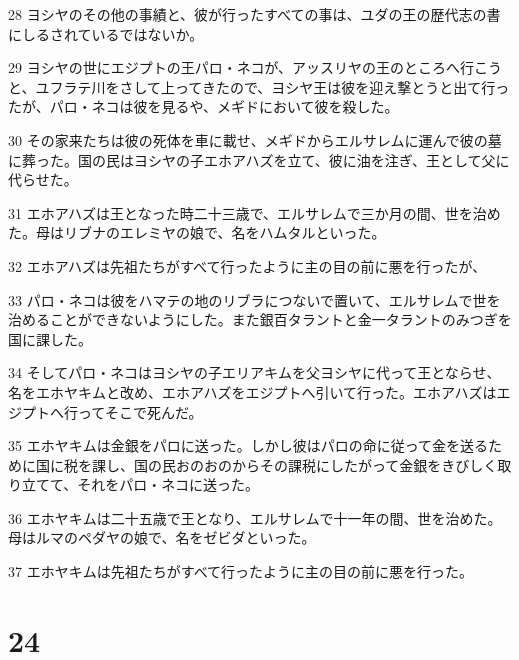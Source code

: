 \par 28 ヨシヤのその他の事績と、彼が行ったすべての事は、ユダの王の歴代志の書にしるされているではないか。
\par 29 ヨシヤの世にエジプトの王パロ・ネコが、アッスリヤの王のところへ行こうと、ユフラテ川をさして上ってきたので、ヨシヤ王は彼を迎え撃とうと出て行ったが、パロ・ネコは彼を見るや、メギドにおいて彼を殺した。
\par 30 その家来たちは彼の死体を車に載せ、メギドからエルサレムに運んで彼の墓に葬った。国の民はヨシヤの子エホアハズを立て、彼に油を注ぎ、王として父に代らせた。
\par 31 エホアハズは王となった時二十三歳で、エルサレムで三か月の間、世を治めた。母はリブナのエレミヤの娘で、名をハムタルといった。
\par 32 エホアハズは先祖たちがすべて行ったように主の目の前に悪を行ったが、
\par 33 パロ・ネコは彼をハマテの地のリブラにつないで置いて、エルサレムで世を治めることができないようにした。また銀百タラントと金一タラントのみつぎを国に課した。
\par 34 そしてパロ・ネコはヨシヤの子エリアキムを父ヨシヤに代って王とならせ、名をエホヤキムと改め、エホアハズをエジプトへ引いて行った。エホアハズはエジプトへ行ってそこで死んだ。
\par 35 エホヤキムは金銀をパロに送った。しかし彼はパロの命に従って金を送るために国に税を課し、国の民おのおのからその課税にしたがって金銀をきびしく取り立てて、それをパロ・ネコに送った。
\par 36 エホヤキムは二十五歳で王となり、エルサレムで十一年の間、世を治めた。母はルマのペダヤの娘で、名をゼビダといった。
\par 37 エホヤキムは先祖たちがすべて行ったように主の目の前に悪を行った。

\chapter{24}

